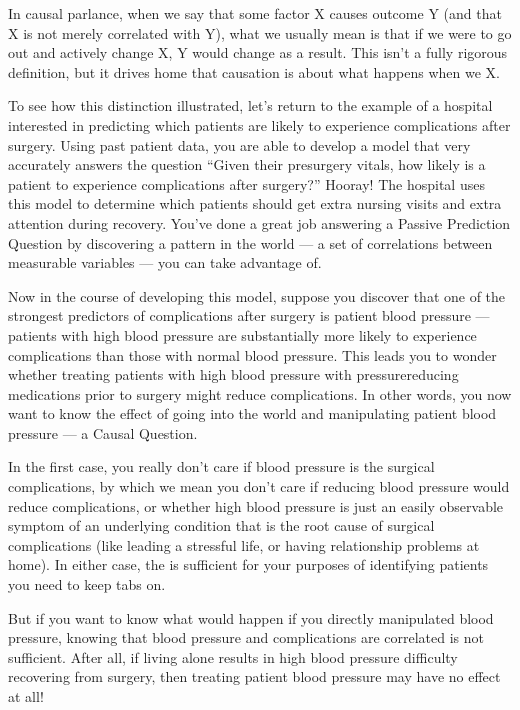 \documentclass[letterpaper,10pt,english]{jupyterBook}
\begin{document}
\sphinxAtStartPar
In causal parlance, when we say that some factor X causes outcome Y (and that X is not merely correlated with Y), what we usually mean is that if we were to go out and actively change X, Y would change as a result. This isn’t a fully rigorous definition, but it drives home that causation is about what happens when we  X.

\sphinxAtStartPar
To see how this distinction illustrated, let’s return to the example of a hospital interested in predicting which patients are likely to experience complications after surgery. Using past patient data, you are able to develop a model that very accurately answers the question “Given their pre\sphinxhyphen{}surgery vitals, how likely is a patient to experience complications after surgery?” Hooray! The hospital uses this model to determine which patients should get extra nursing visits and extra attention during recovery. You’ve done a great job answering a Passive Prediction Question by discovering a pattern in the world — a set of correlations between measurable variables — you can take advantage of.

\sphinxAtStartPar
Now in the course of developing this model, suppose you discover that one of the strongest predictors of complications after surgery is patient blood pressure — patients with high blood pressure are substantially more likely to experience complications than those with normal blood pressure. This leads you to wonder whether treating patients with high blood pressure with pressure\sphinxhyphen{}reducing medications prior to surgery might reduce complications. In other words, you now want to know the effect of going into the world and manipulating patient blood pressure — a Causal Question.

\sphinxAtStartPar
In the first case, you really don’t care if blood pressure is  the surgical complications, by which we mean you don’t care if reducing blood pressure would reduce complications, or whether high blood pressure is just an easily observable symptom of an underlying condition that is the root cause of surgical complications (like leading a stressful life, or having relationship problems at home). In either case, the  is sufficient for your purposes of identifying patients you need to keep tabs on.

\sphinxAtStartPar
But if you want to know what would happen if you directly manipulated blood pressure, knowing that blood pressure and complications are correlated is not sufficient. After all, if living alone results in high blood pressure  difficulty recovering from surgery, then treating patient blood pressure may have no effect at all!
\end{document}
